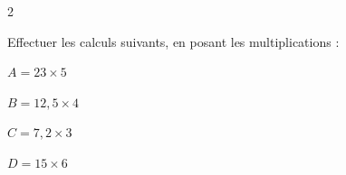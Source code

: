 \begin{multicols}{2}
    \begin{exercice}{}{}
        Effectuer les calculs suivants, en posant les multiplications :
        \begin{enumeratebf}
            \item $A = 23 \times 5$
            \item $B = 12,5 \times 4$
            \item $C = 7,2 \times 3$
            \item $D = 15 \times 6$ 
        \end{enumeratebf}
    \end{exercice}
\end{multicols}
